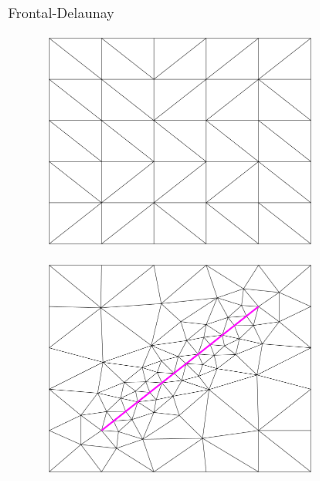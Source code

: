 \begin{figure}[p]
\begin{subfigure}[b]{\textwidth}
\begin{subfigure}[b]{0.33\textwidth}
        \end{subfigure}
        \caption{Frontal-Delaunay}
        \label{fig:Gmsh-Frontal-Delaunay}
    \end{subfigure}
    \begin{subfigure}[b]{\textwidth}
        \centering
        \begin{subfigure}[b]{0.33\textwidth}
            \centering
            \includegraphics[width=\textwidth]{report/Images/Software/Gmsh meshing algorithms/gmsh_meshing_algorithms_delquad.png}
        \end{subfigure}
        \begin{subfigure}[b]{0.33\textwidth}
            \centering
            \includegraphics[width=\textwidth]{report/Images/Software/Gmsh meshing algorithms/gmsh_meshing_algorithms_embedded_delquad.png}

\end{subfigure}
\end{subfigure}
\end{figure}
